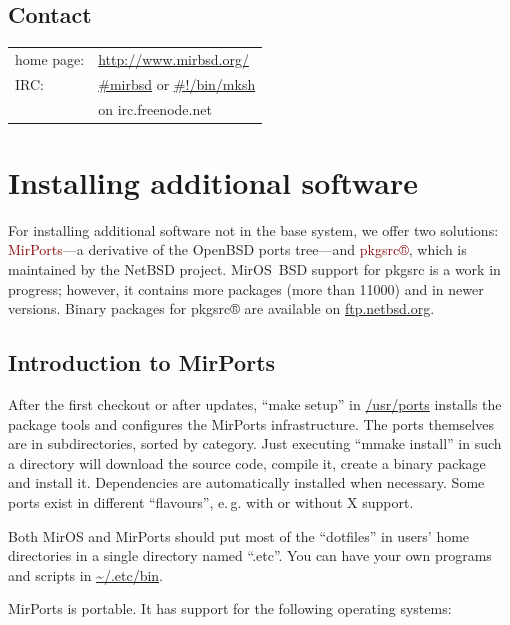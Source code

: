 \documentclass[a4paper,landscape,11pt,notumble]{leaflet}
\begin{document}
\subsection{Contact}
{\noindent\large
\begin{tabular}{ll}
home page: & \textcolor{darkred}{\url{http://www.mirbsd.org/}}\\
IRC: & \textcolor{darkred}{\url{#mirbsd}} or \textcolor{darkred}{\url{#!/bin/mksh}}\\
& on irc.freenode.net\\
\end{tabular}
\par}
\vspace{3ex}%
\graybox

\newpage

\section{Installing additional software}

For installing additional software not in the base system, we offer two solutions: 
\textcolor{darkred}{MirPorts}---a derivative of the OpenBSD ports tree---and \textcolor{darkred}{pkgsrc®}, which is maintained by the NetBSD project.
MirOS~BSD support for pkgsrc is a work in progress; however, it contains more packages (more than 11000) and in newer versions.
Binary packages for pkgsrc® are available on \url{ftp.netbsd.org}.

\subsection{Introduction to MirPorts}

After the first checkout or after updates, ``make setup'' in \url{/usr/ports} installs the package tools and configures the MirPorts infrastructure. The ports themselves are in subdirectories, sorted by category. Just executing ``mmake install'' in such a directory will download the source code, compile it, create a binary package and install it. Dependencies are automatically installed when necessary. Some ports exist in different ``flavours'', e.\,g. with or without X support.

Both MirOS and MirPorts should put most of the ``dotfiles'' in users' home directories in a single directory named ``.etc''. You can have your own programs and scripts in \url{~/.etc/bin}.

MirPorts is portable. It has support for the following operating systems:
\end{document}
